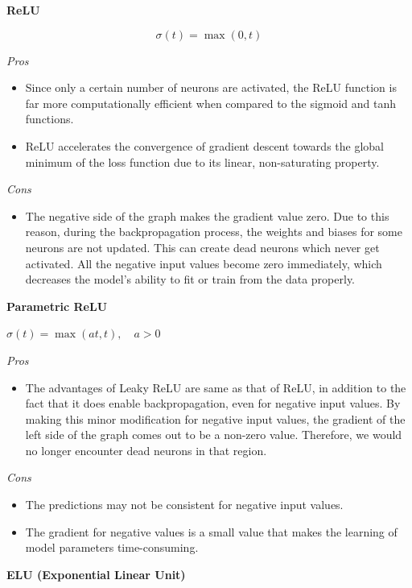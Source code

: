 \textbf{ReLU}

$$\sigma(t)=\max(0,t)$$

\textit{Pros}

\begin{itemize}
  \item Since only a certain number of neurons are activated, the ReLU function is far
more computationally efficient when compared to the sigmoid and tanh
functions.
  \item ReLU accelerates the convergence of gradient descent towards the global
minimum of the loss function due to its linear, non-saturating property.
\end{itemize}

\textit{Cons}

\begin{itemize}
  \item The negative side of the graph makes the gradient value zero. Due to this reason,
during the backpropagation process, the weights and biases for some neurons are
not updated. This can create dead neurons which never get activated.
All the negative input values become zero immediately, which decreases the
model’s ability to fit or train from the data properly.
\end{itemize}

\textbf{Parametric ReLU}

$\sigma(t)=\max(at,t), \quad a>0$

\textit{Pros}

\begin{itemize}
  \item The advantages of Leaky ReLU are same as that of ReLU, in addition to the fact that
it does enable backpropagation, even for negative input values.
By making this minor modification for negative input values, the gradient of the left
side of the graph comes out to be a non-zero value. Therefore, we would no longer
encounter dead neurons in that region.
\end{itemize}

\textit{Cons}

\begin{itemize}
  \item The predictions may not be consistent for negative input values.
  \item The gradient for negative values is a small value that makes the learning of
model parameters time-consuming.
\end{itemize}

\textbf{ELU (Exponential Linear Unit)}

